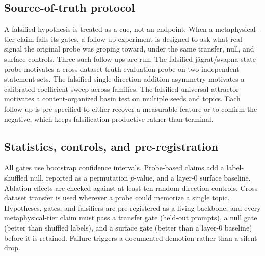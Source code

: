 \subsection{Source-of-truth protocol}
A falsified hypothesis is treated as a cue, not an endpoint. When a metaphysical-tier
claim fails its gates, a follow-up experiment is designed to ask what real signal the
original probe was groping toward, under the same transfer, null, and surface controls.
Three such follow-ups are run. The falsified
j\=agrat/svapna state probe motivates a cross-dataset truth-evaluation probe on two
independent statement sets. The falsified single-direction addition asymmetry motivates
a calibrated coefficient sweep across families. The falsified universal attractor
motivates a content-organized basin test on multiple seeds and topics. Each follow-up
is pre-specified to either recover a measurable feature or to confirm the negative,
which keeps falsification productive rather than terminal.

\subsection{Statistics, controls, and pre-registration}
All gates use bootstrap confidence intervals. Probe-based claims add a label-shuffled
null, reported as a permutation $p$-value, and a layer-0 surface baseline. Ablation
effects are checked against at least ten random-direction controls. Cross-dataset
transfer is used wherever a probe could memorize a single topic. Hypotheses, gates, and
falsifiers are pre-registered as a living backbone, and every metaphysical-tier claim
must pass a transfer gate (held-out prompts), a null gate (better than shuffled
labels), and a surface gate (better than a layer-0 baseline) before it is retained.
Failure triggers a documented demotion rather than a silent drop.
